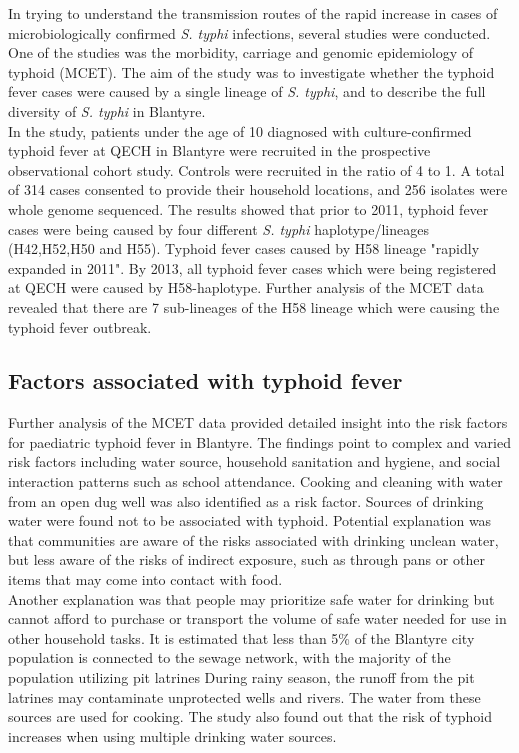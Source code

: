 \documentclass[12pt,a4paper]{report}
\begin{document}
In trying to understand the transmission routes of the rapid increase in cases of microbiologically confirmed \textit{S. typhi} infections, several studies were conducted. One of the studies was the morbidity, carriage and genomic epidemiology of typhoid (MCET).\cite{Feasey} The aim of the study was to investigate whether the typhoid fever cases were caused by a single lineage of \textit{S. typhi}, and to describe the full diversity of \textit{S. typhi} in Blantyre.\\

In the study, patients under the age of 10 diagnosed with culture-confirmed typhoid fever at QECH in Blantyre were recruited in the prospective observational cohort study.\cite{Feasey} Controls were recruited in the ratio of 4 to 1.\cite{Gauld2019} A total of 314 cases consented to provide their household locations, and 256 isolates were whole genome sequenced. The results showed that prior to 2011, typhoid fever cases were being caused by four different \textit{S. typhi} haplotype/lineages (H42,H52,H50 and H55). Typhoid fever cases caused by H58 lineage "rapidly expanded in 2011".\cite{Feasey} By 2013, all typhoid fever cases which were being registered at QECH were caused by H58-haplotype.\cite{Feasey} Further analysis of the MCET data revealed that there are 7 sub-lineages of the H58 lineage which were causing the typhoid fever outbreak.\cite{Wailan}

\subsection{Factors associated with typhoid fever}

Further analysis of the MCET data provided detailed insight into the risk factors for paediatric typhoid fever in Blantyre. The findings point to complex and varied risk factors including water source, household sanitation and hygiene, and social interaction patterns such as school attendance.\cite{Gauld2019} Cooking and cleaning with water from an open dug well was also identified as a risk factor. Sources of drinking water were found not to be associated with typhoid. Potential explanation was that communities are aware of the risks associated with drinking unclean water, but less aware of the risks of indirect exposure, such as through pans or other items that may come into contact with food.\\

Another explanation was that people may prioritize safe water for drinking but cannot afford to purchase or transport the volume of safe water needed for use in other household tasks. It is estimated that  less than 5\% of the Blantyre city population is connected to the sewage network, with the majority of the population utilizing pit latrines \cite{Gauld2019} During rainy season, the runoff from the pit latrines may contaminate unprotected wells and rivers. The water from these sources are used for cooking. The study also found out that the risk of typhoid increases when using multiple drinking water sources.\cite{Gauld2019}
\end{document}
